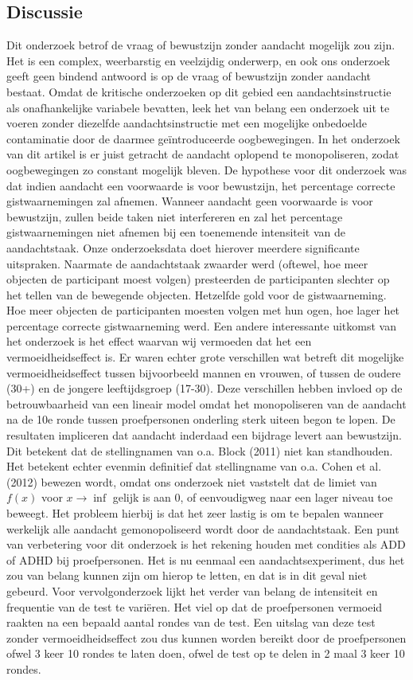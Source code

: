 \documentclass[a4paper,jou]{apa6}  %
\begin{document}
\subsection*{Discussie}
Dit onderzoek betrof de vraag of bewustzijn zonder aandacht mogelijk zou zijn. Het is een complex, weerbarstig en veelzijdig onderwerp, en ook ons onderzoek geeft geen bindend antwoord is op de vraag of bewustzijn zonder aandacht bestaat. 
Omdat de kritische onderzoeken op dit gebied een aandachtsinstructie als onafhankelijke variabele bevatten, leek het van belang een onderzoek uit te voeren zonder diezelfde aandachtsinstructie met een mogelijke onbedoelde contaminatie door de daarmee ge\"introduceerde oogbewegingen. In het onderzoek van dit artikel is er juist getracht de aandacht oplopend te monopoliseren, zodat oogbewegingen zo constant mogelijk bleven. De hypothese voor dit onderzoek was dat indien aandacht een voorwaarde is voor bewustzijn, het percentage correcte gistwaarnemingen zal afnemen. Wanneer aandacht geen voorwaarde is voor bewustzijn, zullen beide taken niet interfereren en zal het percentage gistwaarnemingen niet afnemen bij een toenemende intensiteit van de aandachtstaak. Onze onderzoeksdata doet hierover meerdere significante uitspraken. Naarmate de aandachtstaak zwaarder werd (oftewel, hoe meer objecten de participant moest volgen) presteerden de participanten slechter op het tellen van de bewegende objecten. Hetzelfde gold voor de gistwaarneming. Hoe meer objecten de participanten moesten volgen met hun ogen, hoe lager het percentage correcte gistwaarneming werd. Een andere interessante uitkomst van het onderzoek is het effect waarvan wij vermoeden dat het een vermoeidheidseffect is. Er waren echter grote verschillen wat betreft dit mogelijke vermoeidheidseffect tussen bijvoorbeeld mannen en vrouwen, of tussen de oudere (30+) en de jongere leeftijdsgroep (17-30). Deze verschillen hebben invloed op de betrouwbaarheid van een lineair model omdat het monopoliseren van de aandacht na de 10e ronde tussen proefpersonen onderling sterk uiteen begon te lopen. De resultaten impliceren dat aandacht inderdaad een bijdrage levert aan bewustzijn. Dit betekent dat de stellingnamen van o.a. Block (2011) niet kan standhouden. Het betekent echter evenmin definitief dat stellingname van o.a. Cohen et al. (2012) bewezen wordt, omdat ons onderzoek niet vaststelt dat de limiet van $f(x)$ voor $x\rightarrow\inf$ gelijk is aan 0, of eenvoudigweg naar een lager niveau toe beweegt. Het probleem hierbij is dat het zeer lastig is om te bepalen wanneer werkelijk alle aandacht gemonopoliseerd wordt door de aandachtstaak. 
Een punt van verbetering voor dit onderzoek is het rekening houden met condities als ADD of ADHD bij proefpersonen. Het is nu eenmaal een aandachtsexperiment, dus het zou van belang kunnen zijn om hierop te letten, en dat is in dit geval niet gebeurd. Voor vervolgonderzoek lijkt het verder van belang de intensiteit en frequentie van de test te vari\"eren. Het viel op dat de proefpersonen vermoeid raakten na een bepaald aantal rondes van de test. Een uitslag van deze test zonder vermoeidheidseffect zou dus kunnen worden bereikt door de proefpersonen ofwel 3 keer 10 rondes te laten doen, ofwel de test op te delen in 2 maal 3 keer 10 rondes. 


\end{document}
